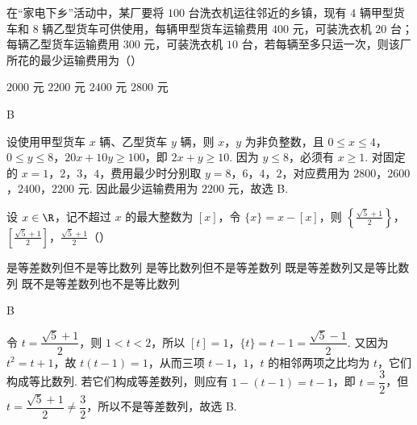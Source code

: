\begin{problem}
在“家电下乡”活动中，某厂要将 \(100\text{ 台}\)洗衣机运往邻近的乡镇，现有 \(4\text{ 辆}\)甲型货车和 \(8\text{ 辆}\)乙型货车可供使用，每辆甲型货车运输费用 \(400\text{ 元}\)，可装洗衣机 \(20\text{ 台}\)；每辆乙型货车运输费用 \(300\text{ 元}\)，可装洗衣机 \(10\text{ 台}\)，若每辆至多只运一次，则该厂所花的最少运输费用为（\quad）

\choices
    {\(2000\text{ 元}\)}
    {\(2200\text{ 元}\)}
    {\(2400\text{ 元}\)}
    {\(2800\text{ 元}\)}
\end{problem}

\begin{answer}
B
\end{answer}

\begin{solution}
设使用甲型货车 \(x\) 辆、乙型货车 \(y\) 辆，则 \(x\)，\(y\) 为非负整数，且 \(0\leq x\leq4\)，\(0\leq y\leq8\)，\(20x+10y\geq100\)，即 \(2x+y\geq10\). 因为 \(y\leq8\)，必须有 \(x\geq1\). 对固定的 \(x=1\)，\(2\)，\(3\)，\(4\)，费用最少时分别取 \(y=8\)，\(6\)，\(4\)，\(2\)，对应费用为 \(2800\)，\(2600\)，\(2400\)，\(2200\) 元. 因此最少运输费用为 \(2200\) 元，故选 B.
\end{solution}

\begin{problem}
设 \(x \in \R\)，记不超过 \(x\) 的最大整数为 \([x]\)，令 \(\{x\} = x - [x]\)，则 \(\left\{\frac{\sqrt{5}+1}{2}\right\}\)，\(\left[\frac{\sqrt{5}+1}{2}\right]\)，\(\frac{\sqrt{5}+1}{2}\)（\quad）

\choices
    {是等差数列但不是等比数列}
    {是等比数列但不是等差数列}
    {既是等差数列又是等比数列}
    {既不是等差数列也不是等比数列}
\end{problem}

\begin{answer}
B
\end{answer}

\begin{solution}
令 \(t=\dfrac{\sqrt5+1}{2}\)，则 \(1<t<2\)，所以 \([t]=1\)，\(\{t\}=t-1=\dfrac{\sqrt5-1}{2}\). 又因为 \(t^2=t+1\)，故 \(t(t-1)=1\)，从而三项 \(t-1\)，\(1\)，\(t\) 的相邻两项之比均为 \(t\)，它们构成等比数列. 若它们构成等差数列，则应有 \(1-(t-1)=t-1\)，即 \(t=\dfrac32\)，但 \(t=\dfrac{\sqrt5+1}{2}\neq\dfrac32\)，所以不是等差数列，故选 B.
\end{solution}

